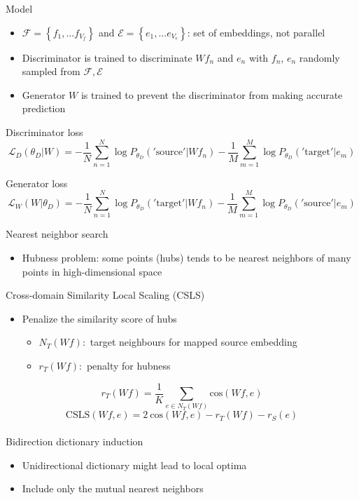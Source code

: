 \documentclass[11pt, a4paper, landscape]{article}
\begin{document}
	
	\NewPage
	\vfill
	Model
	\begin{itemize}
		\item  ${\mathcal{F} = \left\{ f_1, \ldots f_{V_f} \right\} }$ and  ${\mathcal{E} = \left\{ e_1, \ldots e_{V_e} \right\} }$: set of embeddings, not parallel
		\item Discriminator is trained to discriminate ${W{f_n}}$ and ${e_n}$ with ${f_n}$, ${e_n}$ randomly sampled from ${ \mathcal{F},  \mathcal{E} }$ 
		\item Generator ${W}$ is trained to prevent the discriminator from making accurate prediction
		
	\end{itemize}
	
	
	
	Discriminator loss
	\[ \mathcal{L}_D(\theta_D|W) = -\frac{1}{N}\sum_{n=1}^{N}\log P_{\theta_D}('\text{source}'| W f_n) - \frac{1}{M}\sum_{m=1}^{M}\log P_{\theta_D}('\text{target}'| e_m)\]
	
	
	Generator  loss 
	\[ \mathcal{L}_W(W|\theta_D) = -\frac{1}{N}\sum_{n=1}^{N}\log P_{\theta_D}('\text{target}'| W f_n) - \frac{1}{M}\sum_{m=1}^{M}\log P_{\theta_D}('\text{source}'| e_m)\]
	



	\NewPage
	\vfill
	Nearest neighbor search
	\begin{itemize}
		\item Hubness problem: some points (hubs) tends to be nearest neighbors of many points in high-dimensional space\\
	\end{itemize}
	Cross-domain Similarity Local Scaling (CSLS)
	\begin{itemize}

		\item Penalize the similarity score of hubs
			\begin{itemize}
				\item $N_T(Wf):$ target neighbours for mapped source embedding
				\item $r_T(W f):$ penalty for hubness
			\end{itemize}
	\end{itemize}
	\[r_T(W f) = \frac{1}{K} \sum_{e \in N_T(Wf)}\textrm{cos}(Wf, e) \]
	\[ \textrm{CSLS}(Wf, e) = 2\ \textrm{cos}(Wf, e)-r_{T}(Wf)-r_{S}(e)\]\\
	Bidirection dictionary induction
	\begin{itemize}
		\item Unidirectional dictionary might lead to local optima
		\item Include only the mutual nearest neighbors 
	\end{itemize}
	\vfill
	
\end{document}
